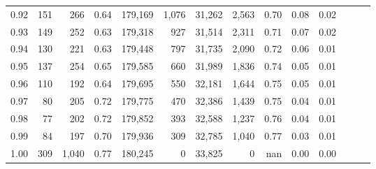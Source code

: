 \begin{tabular}{rrrrrrrrrrrrrr}
0.92 &    151 &    266 &  0.64 &  179,169 &    1,076 &  31,262 &   2,563 &  0.70 &  0.08 &      0.02 \\
0.93 &    149 &    252 &  0.63 &  179,318 &      927 &  31,514 &   2,311 &  0.71 &  0.07 &      0.02 \\
0.94 &    130 &    221 &  0.63 &  179,448 &      797 &  31,735 &   2,090 &  0.72 &  0.06 &      0.01 \\
0.95 &    137 &    254 &  0.65 &  179,585 &      660 &  31,989 &   1,836 &  0.74 &  0.05 &      0.01 \\
0.96 &    110 &    192 &  0.64 &  179,695 &      550 &  32,181 &   1,644 &  0.75 &  0.05 &      0.01 \\
0.97 &     80 &    205 &  0.72 &  179,775 &      470 &  32,386 &   1,439 &  0.75 &  0.04 &      0.01 \\
0.98 &     77 &    202 &  0.72 &  179,852 &      393 &  32,588 &   1,237 &  0.76 &  0.04 &      0.01 \\
0.99 &     84 &    197 &  0.70 &  179,936 &      309 &  32,785 &   1,040 &  0.77 &  0.03 &      0.01 \\
1.00 &    309 &  1,040 &  0.77 &  180,245 &        0 &  33,825 &       0 &   nan &  0.00 &      0.00 \\
\bottomrule
\end{tabular}
